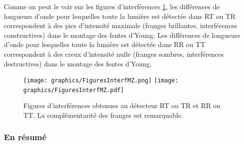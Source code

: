 Comme on peut le voir sur les figures d'interférences \ref{fig:FiguresInterMZ},
les différences de longueurs d'onde pour lesquelles toute la lumière est
détectée dans RT ou TR correspondent à des pics d'intensité maximale (franges
brillantes, interférences constructives) dans le montage des fentes d'Young.
Les différences de longueurs d'onde pour lesquelles toute la lumière est
détectée dans RR ou TT correspondent à des creux d'intensité nulle (franges
sombres, interférences destructives) dans le montage des fentes d'Young.

\begin{figure}[ptbh]
\centering
\ifcase\msipdfoutput
  \texttt{[image: graphics/FiguresInterfMZ.png]}
\else
  \texttt{[image: graphics/FiguresInterfMZ.pdf]}
\fi
\caption{Figures d'interférences obtenues au détecteur RT ou TR et RR ou TT.
La complémentarité des franges est remarquable.}%
\label{fig:FiguresInterMZ}%
\end{figure}

\subsubsection{En résumé}

